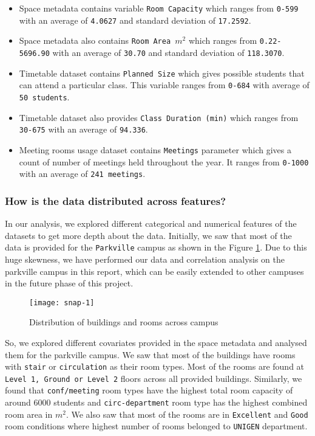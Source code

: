 \begin{itemize}
    \item Space metadata contains variable \texttt{Room Capacity} which ranges from \texttt{0-599} with an average of \texttt{4.0627} and standard deviation of \texttt{17.2592}.
    \item Space metadata also contains \texttt{Room Area $m^2$} which ranges from \texttt{0.22-5696.90} with an average of \texttt{30.70} and standard deviation of \texttt{118.3070}.
    \item Timetable dataset contains \texttt{Planned Size} which gives possible students that can attend a particular class. This variable ranges from \texttt{0-684} with average of \texttt{50 students}.
    \item Timetable dataset also provides \texttt{Class Duration (min)} which ranges from \texttt{30-675} with an average of \texttt{94.336}.
    \item Meeting rooms usage dataset contains \texttt{Meetings} parameter which gives a count of number of meetings held throughout the year. It ranges from \texttt{0-1000} with an average of \texttt{241 meetings}.
\end{itemize}

\subsubsection{How is the data distributed across features?}

In our analysis, we explored different categorical and numerical features of the datasets to get more depth about the data. Initially, we saw that most of the data is provided for the \texttt{Parkville} campus as shown in the Figure \ref{fig:expo-image-1}. Due to this huge skewness, we have performed our data and correlation analysis on the parkville campus in this report, which can be easily extended to other campuses in the future phase of this project.

\begin{figure}[H]
\centering
\texttt{[image: snap-1]}
\caption{Distribution of buildings and rooms across campus}
\label{fig:expo-image-1}
\end{figure}

So, we explored different covariates provided in the space metadata and analysed them for the parkville campus. We saw that most of the buildings have rooms with \texttt{stair} or \texttt{circulation} as their room types. Most of the rooms are found at \texttt{Level 1, Ground or Level 2} floors across all provided buildings. Similarly, we found that \texttt{conf/meeting} room types have the highest total room capacity of around 6000 students and \texttt{circ-department} room type has the highest combined room area in $m^2$. We also saw that most of the rooms are in \texttt{Excellent} and \texttt{Good} room conditions where highest number of rooms belonged to \texttt{UNIGEN} department.

